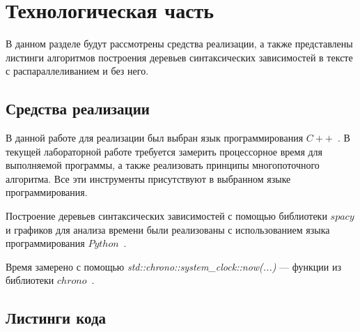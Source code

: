 \chapter{Технологическая часть}

В данном разделе будут рассмотрены средства реализации, а также представлены листинги алгоритмов построения деревьев синтаксических зависимостей в тексте с распараллеливанием и без него.
\section{Средства реализации}
В данной работе для реализации был выбран язык программирования $C++$~\cite{cpp-lang}. В текущей лабораторной работе требуется замерить процессорное время для выполняемой программы, а также реализовать принципы многопоточного алгоритма. Все эти инструменты присутствуют в выбранном языке программирования. 

Построение деревьев синтаксических зависимостей с помощью библиотеки $spacy$ и графиков для анализа времени были реализованы с использованием языка программирования $Python$~\cite{python-lang}.

Время замерено с помощью \textit{std::chrono::system\_clock::now(...)} --- функции из библиотеки $chrono$~\cite{cpp-lang-chrono}.
\section{Листинги кода}

